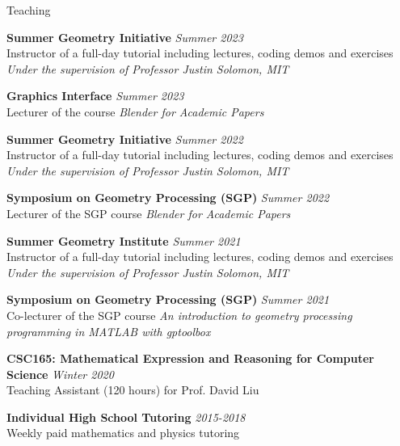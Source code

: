 \documentclass{resume}
\newcommand{\cvitembig}[4]{
    {\bf #1} \hfill {\em \small #2} \\ 
    {\small#3 }\\
    {\it \small #4}
}
\newcommand{\cvitem}[3]{
    {\bf #1} \hfill {\em \small #2} \\ 
    {\small#3 }
}
\begin{document}
\begin{rSection}{Teaching}

\cvitembig{Summer Geometry Initiative}{Summer 2023}{Instructor of a full-day tutorial including lectures, coding demos and exercises}{Under the supervision of Professor Justin Solomon, MIT}

\cvitem{Graphics Interface}{Summer 2023}{Lecturer of the course {\it Blender for Academic Papers}}

\cvitembig{Summer Geometry Initiative}{Summer 2022}{Instructor of a full-day tutorial including lectures, coding demos and exercises}{Under the supervision of Professor Justin Solomon, MIT}

\cvitem{Symposium on Geometry Processing (SGP)}{Summer 2022}{Lecturer of the SGP course {\it Blender for Academic Papers}}

\cvitembig{Summer Geometry Institute}{Summer 2021}{Instructor of a full-day tutorial including lectures, coding demos and exercises}{Under the supervision of Professor Justin Solomon, MIT}

\cvitem{Symposium on Geometry Processing (SGP)}{Summer 2021}{Co-lecturer of the SGP course {\it An introduction to geometry processing  programming in MATLAB with gptoolbox}}

\cvitem{CSC165: Mathematical Expression and Reasoning for Computer Science}{Winter 2020}{Teaching Assistant (120 hours) for Prof. David Liu}

\cvitem{Individual High School Tutoring}{2015-2018}{Weekly paid mathematics and physics tutoring}

\end{rSection}
\end{document}
